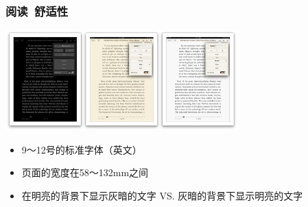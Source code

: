 \documentclass{beamer}
\begin{document}
\begin{frame}
	\frametitle{阅读~{\small 舒适性}}
	\beamertemplatetransparentcovereddynamicmedium
	\begin{center}
		\includegraphics[width=9cm]{images/ibooks-themes.jpg}
	\end{center}
	\begin{itemize}
		\item 9～12号的标准字体（英文）\pause
		\item 页面的宽度在58～132mm之间\pause
		\item 在明亮的背景下显示灰暗的文字 VS. 灰暗的背景下显示明亮的文字
	\end{itemize}
\end{frame}
\end{document}
